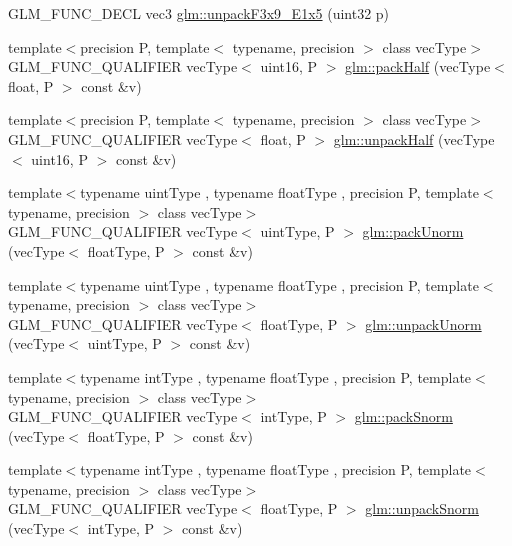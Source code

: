 \begin{DoxyCompactItemize}
\item 
G\+L\+M\+\_\+\+F\+U\+N\+C\+\_\+\+D\+E\+CL vec3 \hyperlink{group__gtc__packing_ga15d8845a31e1e55d493803d0c8cb5910}{glm\+::unpack\+F3x9\+\_\+\+E1x5} (uint32 p)
\item 
{\footnotesize template$<$precision P, template$<$ typename, precision $>$ class vec\+Type$>$ }\\G\+L\+M\+\_\+\+F\+U\+N\+C\+\_\+\+Q\+U\+A\+L\+I\+F\+I\+ER vec\+Type$<$ uint16, P $>$ \hyperlink{group__gtc__packing_ga896d806b72e390eb953786cca3632ec9}{glm\+::pack\+Half} (vec\+Type$<$ float, P $>$ const \&v)
\item 
{\footnotesize template$<$precision P, template$<$ typename, precision $>$ class vec\+Type$>$ }\\G\+L\+M\+\_\+\+F\+U\+N\+C\+\_\+\+Q\+U\+A\+L\+I\+F\+I\+ER vec\+Type$<$ float, P $>$ \hyperlink{group__gtc__packing_gaf3f9387834f8d8beadfe723c1dd247a7}{glm\+::unpack\+Half} (vec\+Type$<$ uint16, P $>$ const \&v)
\item 
{\footnotesize template$<$typename uint\+Type , typename float\+Type , precision P, template$<$ typename, precision $>$ class vec\+Type$>$ }\\G\+L\+M\+\_\+\+F\+U\+N\+C\+\_\+\+Q\+U\+A\+L\+I\+F\+I\+ER vec\+Type$<$ uint\+Type, P $>$ \hyperlink{group__gtc__packing_gacb9a3df68172c1193c9d701a3fa4d88b}{glm\+::pack\+Unorm} (vec\+Type$<$ float\+Type, P $>$ const \&v)
\item 
{\footnotesize template$<$typename uint\+Type , typename float\+Type , precision P, template$<$ typename, precision $>$ class vec\+Type$>$ }\\G\+L\+M\+\_\+\+F\+U\+N\+C\+\_\+\+Q\+U\+A\+L\+I\+F\+I\+ER vec\+Type$<$ float\+Type, P $>$ \hyperlink{group__gtc__packing_gad3d7e1ec7fcfb7ae341658e2ce1c3bd9}{glm\+::unpack\+Unorm} (vec\+Type$<$ uint\+Type, P $>$ const \&v)
\item 
{\footnotesize template$<$typename int\+Type , typename float\+Type , precision P, template$<$ typename, precision $>$ class vec\+Type$>$ }\\G\+L\+M\+\_\+\+F\+U\+N\+C\+\_\+\+Q\+U\+A\+L\+I\+F\+I\+ER vec\+Type$<$ int\+Type, P $>$ \hyperlink{group__gtc__packing_ga1be760860697db386b36513aeafe9d5e}{glm\+::pack\+Snorm} (vec\+Type$<$ float\+Type, P $>$ const \&v)
\item 
{\footnotesize template$<$typename int\+Type , typename float\+Type , precision P, template$<$ typename, precision $>$ class vec\+Type$>$ }\\G\+L\+M\+\_\+\+F\+U\+N\+C\+\_\+\+Q\+U\+A\+L\+I\+F\+I\+ER vec\+Type$<$ float\+Type, P $>$ \hyperlink{group__gtc__packing_ga63eeec0d416e48462f341f4a7a9a45fe}{glm\+::unpack\+Snorm} (vec\+Type$<$ int\+Type, P $>$ const \&v)

\end{DoxyCompactItemize}
